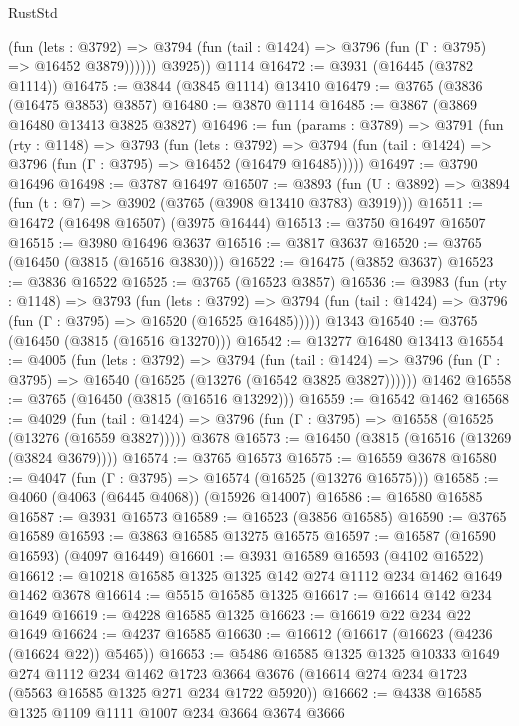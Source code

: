 \begin{lexlean}{RustStd}
\begin{coremodule}
              (fun (lets : @3792) =>
              @3794 (fun (tail : @1424) => @3796 (fun (Γ : @3795) => @16452 @3879))))))
        @3925))
    @1114
@16472 := @3931 (@16445 (@3782 @1114))
@16475 := @3844 (@3845 @1114) @13410
@16479 := @3765 (@3836 (@16475 @3853) @3857)
@16480 := @3870 @1114
@16485 := @3867 (@3869 @16480 @13413 @3825 @3827)
@16496 := fun (params : @3789) =>
  @3791
    (fun (rty : @1148) =>
    @3793
      (fun (lets : @3792) =>
      @3794 (fun (tail : @1424) => @3796 (fun (Γ : @3795) => @16452 (@16479 @16485)))))
@16497 := @3790 @16496
@16498 := @3787 @16497
@16507 := @3893
    (fun (U : @3892) => @3894 (fun (t : @7) => @3902 (@3765 (@3908 @13410 @3783) @3919)))
@16511 := @16472 (@16498 @16507) (@3975 @16444)
@16513 := @3750 @16497 @16507
@16515 := @3980 @16496 @3637
@16516 := @3817 @3637
@16520 := @3765 (@16450 (@3815 (@16516 @3830)))
@16522 := @16475 (@3852 @3637)
@16523 := @3836 @16522
@16525 := @3765 (@16523 @3857)
@16536 := @3983
    (fun (rty : @1148) =>
    @3793
      (fun (lets : @3792) =>
      @3794 (fun (tail : @1424) => @3796 (fun (Γ : @3795) => @16520 (@16525 @16485)))))
    @1343
@16540 := @3765 (@16450 (@3815 (@16516 @13270)))
@16542 := @13277 @16480 @13413
@16554 := @4005
    (fun (lets : @3792) =>
    @3794
      (fun (tail : @1424) =>
      @3796 (fun (Γ : @3795) => @16540 (@16525 (@13276 (@16542 @3825 @3827))))))
    @1462
@16558 := @3765 (@16450 (@3815 (@16516 @13292)))
@16559 := @16542 @1462
@16568 := @4029
    (fun (tail : @1424) => @3796 (fun (Γ : @3795) => @16558 (@16525 (@13276 (@16559 @3827)))))
    @3678
@16573 := @16450 (@3815 (@16516 (@13269 (@3824 @3679))))
@16574 := @3765 @16573
@16575 := @16559 @3678
@16580 := @4047 (fun (Γ : @3795) => @16574 (@16525 (@13276 @16575)))
@16585 := @4060 (@4063 (@6445 @4068)) (@15926 @14007)
@16586 := @16580 @16585
@16587 := @3931 @16573
@16589 := @16523 (@3856 @16585)
@16590 := @3765 @16589
@16593 := @3863 @16585 @13275 @16575
@16597 := @16587 (@16590 @16593) (@4097 @16449)
@16601 := @3931 @16589 @16593 (@4102 @16522)
@16612 := @10218 @16585 @1325 @1325 @142 @274 @1112 @234 @1462 @1649 @1462 @3678
@16614 := @5515 @16585 @1325
@16617 := @16614 @142 @234 @1649
@16619 := @4228 @16585 @1325
@16623 := @16619 @22 @234 @22 @1649
@16624 := @4237 @16585
@16630 := @16612 (@16617 (@16623 (@4236 (@16624 @22)) @5465))
@16653 := @5486
    @16585
    @1325
    @1325
    @10333
    @1649
    @274
    @1112
    @234
    @1462
    @1723
    @3664
    @3676
    (@16614 @274 @234 @1723 (@5563 @16585 @1325 @271 @234 @1722 @5920))
@16662 := @4338 @16585 @1325 @1109 @1111 @1007 @234 @3664 @3674 @3666

\end{coremodule}
\end{lexlean}
